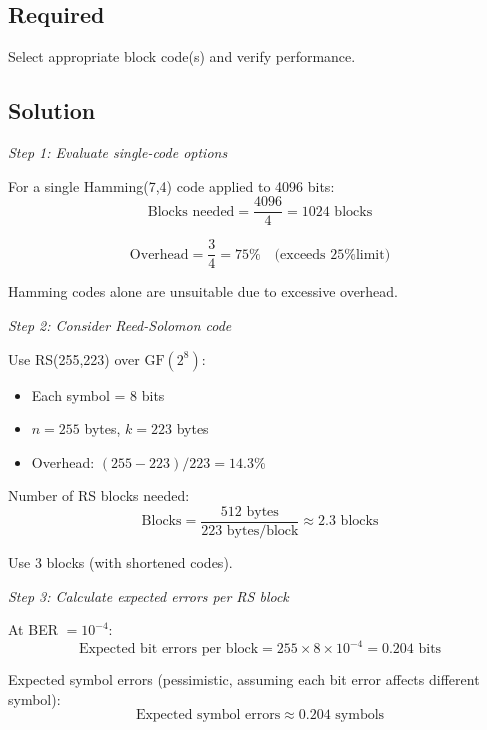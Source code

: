 \subsection*{Required}

Select appropriate block code(s) and verify performance.

\subsection*{Solution}

\textit{Step 1: Evaluate single-code options}

For a single Hamming(7,4) code applied to 4096 bits:
\begin{equation}
\text{Blocks needed} = \frac{4096}{4} = 1024 \text{ blocks}
\end{equation}

\begin{equation}
\text{Overhead} = \frac{3}{4} = 75\% \quad \text{(exceeds 25\% limit)}
\end{equation}

Hamming codes alone are unsuitable due to excessive overhead.

\textit{Step 2: Consider Reed-Solomon code}

Use RS(255,223) over $\mathrm{GF}(2^8)$:
\begin{itemize}
\item Each symbol = 8 bits
\item $n = 255$ bytes, $k = 223$ bytes
\item Overhead: $(255-223)/223 = 14.3\%$ \checkmark
\end{itemize}

Number of RS blocks needed:
\begin{equation}
\text{Blocks} = \frac{512 \text{ bytes}}{223 \text{ bytes/block}} \approx 2.3 \text{ blocks}
\end{equation}

Use 3 blocks (with shortened codes).

\textit{Step 3: Calculate expected errors per RS block}

At BER $= 10^{-4}$:
\begin{equation}
\text{Expected bit errors per block} = 255 \times 8 \times 10^{-4} = 0.204 \text{ bits}
\end{equation}

Expected symbol errors (pessimistic, assuming each bit error affects different symbol):
\begin{equation}
\text{Expected symbol errors} \approx 0.204 \text{ symbols}
\end{equation}

